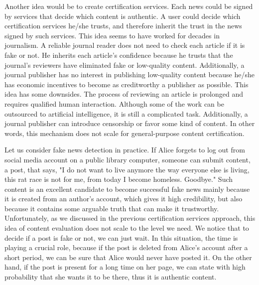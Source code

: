 Another idea would be to create certification services. Each news could be signed by services that decide which content is authentic. A user could decide which certification services he/she trusts, and therefore inherit the trust in the news signed by such services. This idea seems to have worked for decades in journalism. A reliable journal reader does not need to check each article if it is fake or not. He inherits each article's confidence because he trusts that the journal's reviewers have eliminated fake or low-quality content. Additionally, a journal publisher has no interest in publishing low-quality content because he/she has economic incentives to become as creditworthy a publisher as possible.
This idea has some downsides. The process of reviewing an article is prolonged and requires qualified human interaction. Although some of the work can be outsourced to artificial intelligence, it is still a complicated task. Additionally, a journal publisher can introduce censorship or favor some kind of content. In other words, this mechanism does not scale for general-purpose content certification.

Let us consider fake news detection in practice. If Alice forgets to log out from social media account on a public library computer, someone can submit content, a post, that says, "I do not want to live anymore the way everyone else is living, this rat race is not for me, from today I become homeless. Goodbye." Such content is an excellent candidate to become successful fake news mainly because it is created from an author's account, which gives it high credibility, but also because it contains some arguable truth that can make it trustworthy. Unfortunately, as we discussed in the previous certification services approach, this idea of content evaluation does not scale to the level we need. We notice that to decide if a post is fake or not, we can just wait. In this situation, the time is playing a crucial role, because if the post is deleted from Alice's account after a short period, we can be sure that Alice would never have posted it. On the other hand, if the post is present for a long time on her page, we can state with high probability that she wants it to be there, thus it is authentic content.

